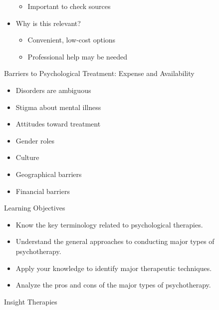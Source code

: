 \documentclass[
]{book}
\providecommand{\tightlist}{%
  \setlength{\itemsep}{0pt}\setlength{\parskip}{0pt}}
\begin{document}
\begin{reflect}
\begin{itemize}
  \begin{itemize}
  \tightlist
  \item
    Important to check sources\\
  \end{itemize}
\item
  Why is this relevant?

  \begin{itemize}
  \tightlist
  \item
    Convenient, low-cost options\\
  \item
    Professional help may be needed
  \end{itemize}
\end{itemize}

Barriers to Psychological Treatment: Expense and Availability

\begin{itemize}
\tightlist
\item
  Disorders are ambiguous\\
\item
  Stigma about mental illness\\
\item
  Attitudes toward treatment\\
\item
  Gender roles\\
\item
  Culture\\
\item
  Geographical barriers\\
\item
  Financial barriers
\end{itemize}

Learning Objectives

\begin{itemize}
\tightlist
\item
  Know the key terminology related to psychological therapies.\\
\item
  Understand the general approaches to conducting major types of psychotherapy.\\
\item
  Apply your knowledge to identify major therapeutic techniques.\\
\item
  Analyze the pros and cons of the major types of psychotherapy.
\end{itemize}

Insight Therapies


\end{reflect}
\end{document}
